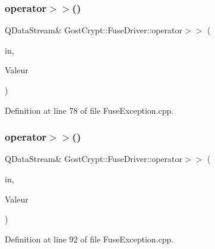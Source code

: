\subsubsection{\texorpdfstring{operator$>$$>$()}{operator>>()}\hspace{0.1cm}{\footnotesize\ttfamily [5/6]}}
{\footnotesize\ttfamily Q\+Data\+Stream\& Gost\+Crypt\+::\+Fuse\+Driver\+::operator$>$$>$ (\begin{DoxyParamCaption}\item[{Q\+Data\+Stream \&}]{in,  }\item[{\hyperlink{class_gost_crypt_1_1_fuse_driver_1_1_volume_not_opened_yet}{Gost\+Crypt\+::\+Fuse\+Driver\+::\+Volume\+Not\+Opened\+Yet} \&}]{Valeur }\end{DoxyParamCaption})}



Definition at line 78 of file Fuse\+Exception.\+cpp.

\mbox{\label{namespace_gost_crypt_1_1_fuse_driver_a119cbf6e7bc642ab3bd90e3d4678237e}} 
\subsubsection{\texorpdfstring{operator$>$$>$()}{operator>>()}\hspace{0.1cm}{\footnotesize\ttfamily [6/6]}}
{\footnotesize\ttfamily Q\+Data\+Stream\& Gost\+Crypt\+::\+Fuse\+Driver\+::operator$>$$>$ (\begin{DoxyParamCaption}\item[{Q\+Data\+Stream \&}]{in,  }\item[{\hyperlink{class_gost_crypt_1_1_fuse_driver_1_1_failed_create_fuse_mount_point}{Gost\+Crypt\+::\+Fuse\+Driver\+::\+Failed\+Create\+Fuse\+Mount\+Point} \&}]{Valeur }\end{DoxyParamCaption})}



Definition at line 92 of file Fuse\+Exception.\+cpp.

\mbox{\label{namespace_gost_crypt_1_1_fuse_driver_af0bbb5bc0d09fd490f41a93dc588ce1d}} 
